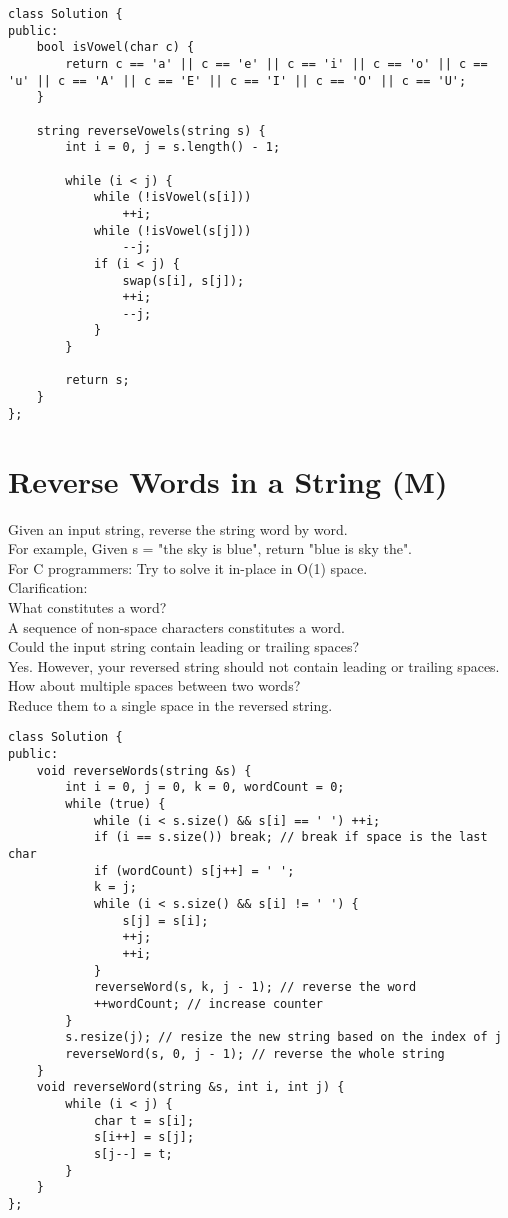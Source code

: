 \begin{lstlisting}
class Solution {
public:
    bool isVowel(char c) {
        return c == 'a' || c == 'e' || c == 'i' || c == 'o' || c == 'u' || c == 'A' || c == 'E' || c == 'I' || c == 'O' || c == 'U';
    }
    
    string reverseVowels(string s) {
        int i = 0, j = s.length() - 1;
        
        while (i < j) {
            while (!isVowel(s[i]))
                ++i;
            while (!isVowel(s[j]))
                --j;
            if (i < j) {
                swap(s[i], s[j]);
                ++i;
                --j;
            }
        }
        
        return s;
    }
};
\end{lstlisting}


\section{Reverse Words in a String (M)}
Given an input string, reverse the string word by word.\\

For example,
Given s = "the sky is blue",
return "blue is sky the". \\

For C programmers: Try to solve it in-place in O(1) space.\\

Clarification:\\
    What constitutes a word?\\
    A sequence of non-space characters constitutes a word.\\
    Could the input string contain leading or trailing spaces?\\
    Yes. However, your reversed string should not contain leading or trailing spaces.\\
    How about multiple spaces between two words?\\
    Reduce them to a single space in the reversed string.\\

\begin{lstlisting}
class Solution {
public:
    void reverseWords(string &s) {
        int i = 0, j = 0, k = 0, wordCount = 0;
        while (true) {
            while (i < s.size() && s[i] == ' ') ++i;
            if (i == s.size()) break; // break if space is the last char
            if (wordCount) s[j++] = ' ';
            k = j;
            while (i < s.size() && s[i] != ' ') {
                s[j] = s[i];
                ++j; 
                ++i;
            }
            reverseWord(s, k, j - 1); // reverse the word
            ++wordCount; // increase counter
        }
        s.resize(j); // resize the new string based on the index of j
        reverseWord(s, 0, j - 1); // reverse the whole string
    }
    void reverseWord(string &s, int i, int j) {
        while (i < j) {
            char t = s[i];
            s[i++] = s[j];
            s[j--] = t;
        }
    }
};
\end{lstlisting}



